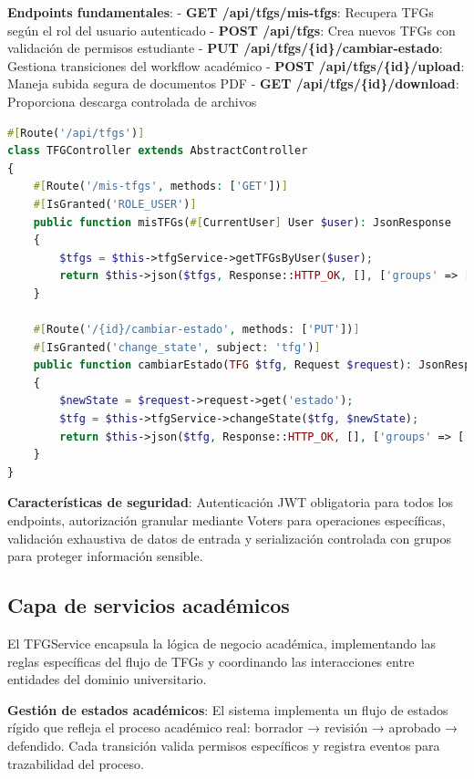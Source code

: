 \documentclass[12pt,a4paper,oneside]{report}
\begin{document}
\textbf{Endpoints fundamentales}:
- \textbf{GET /api/tfgs/mis-tfgs}: Recupera TFGs según el rol del usuario autenticado
- \textbf{POST /api/tfgs}: Crea nuevos TFGs con validación de permisos estudiante
- \textbf{PUT /api/tfgs/\{id\}/cambiar-estado}: Gestiona transiciones del workflow académico
- \textbf{POST /api/tfgs/\{id\}/upload}: Maneja subida segura de documentos PDF
- \textbf{GET /api/tfgs/\{id\}/download}: Proporciona descarga controlada de archivos

\begin{lstlisting}[language=PHP]
#[Route('/api/tfgs')]
class TFGController extends AbstractController
{
    #[Route('/mis-tfgs', methods: ['GET'])]
    #[IsGranted('ROLE_USER')]
    public function misTFGs(#[CurrentUser] User $user): JsonResponse
    {
        $tfgs = $this->tfgService->getTFGsByUser($user);
        return $this->json($tfgs, Response::HTTP_OK, [], ['groups' => ['tfg:read']]);
    }

    #[Route('/{id}/cambiar-estado', methods: ['PUT'])]
    #[IsGranted('change_state', subject: 'tfg')]
    public function cambiarEstado(TFG $tfg, Request $request): JsonResponse
    {
        $newState = $request->request->get('estado');
        $tfg = $this->tfgService->changeState($tfg, $newState);
        return $this->json($tfg, Response::HTTP_OK, [], ['groups' => ['tfg:read']]);
    }
}
\end{lstlisting}

\textbf{Características de seguridad}: Autenticación JWT obligatoria para todos los endpoints, autorización granular mediante Voters para operaciones específicas, validación exhaustiva de datos de entrada y serialización controlada con grupos para proteger información sensible.

\subsection{Capa de servicios académicos}\label{capa-de-servicios---tfgservice}

El TFGService encapsula la lógica de negocio académica, implementando las reglas específicas del flujo de TFGs y coordinando las interacciones entre entidades del dominio universitario.

\textbf{Gestión de estados académicos}: El sistema implementa un flujo de estados rígido que refleja el proceso académico real: borrador → revisión → aprobado → defendido. Cada transición valida permisos específicos y registra eventos para trazabilidad del proceso.
\end{document}
